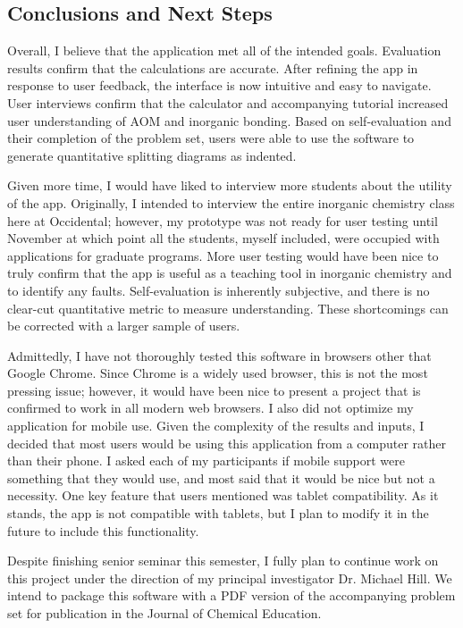 \documentclass[10pt,twocolumn]{article}
\begin{document}
\subsection{Conclusions and Next Steps}
Overall, I believe that the application met all of the intended goals. Evaluation results confirm that the calculations are accurate. After refining the app in response to user feedback, the interface is now intuitive and easy to navigate. User interviews confirm that the calculator and accompanying tutorial increased user understanding of AOM and inorganic bonding. Based on self-evaluation and their completion of the problem set, users were able to use the software to generate quantitative splitting diagrams as indented.

Given more time, I would have liked to interview more students about the utility of the app. Originally, I intended to interview the entire inorganic chemistry class here at Occidental; however, my prototype was not ready for user testing until November at which point all the students, myself included, were occupied with applications for graduate programs. More user testing would have been nice to truly confirm that the app is useful as a teaching tool in inorganic chemistry and to identify any faults. Self-evaluation is inherently subjective, and there is no clear-cut quantitative metric to measure understanding. These shortcomings can be corrected with a larger sample of users.

Admittedly, I have not thoroughly tested this software in browsers other that Google Chrome. Since Chrome is a widely used browser, this is not the most pressing issue; however, it would have been nice to present a project that is confirmed to work in all modern web browsers. I also did not optimize my application for mobile use. Given the complexity of the results and inputs, I decided that most users would be using this application from a computer rather than their phone. I asked each of my participants if mobile support were something that they would use, and most said that it would be nice but not a necessity. One key feature that users mentioned was tablet compatibility. As it stands, the app is not compatible with tablets, but I plan to modify it in the future to include this functionality.

Despite finishing senior seminar this semester, I fully plan to continue work on this project under the direction of my principal investigator Dr. Michael Hill. We intend to package this software with a PDF version of the accompanying problem set for publication in the Journal of Chemical Education.

\printbibliography
\end{document}
